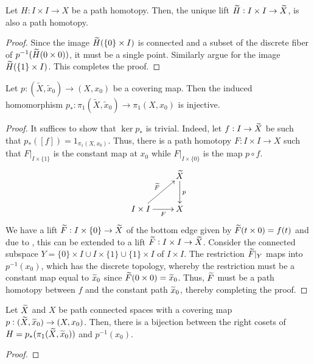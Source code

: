 \begin{corollary}
    Let $H: I\times I\to X$ be a path homotopy. Then, the unique lift $\widetilde{H}: I\times I\to\widetilde{X}$, is also a path homotopy.
\end{corollary}
\begin{proof}
    Since the image $\widetilde{H}(\{0\}\times I)$ is connected and a subset of the discrete fiber of $p^{-1}(\widetilde{H}(0\times 0))$, it must be a single point. Similarly argue for the image $\widetilde{H}(\{1\}\times I)$. This completes the proof.
\end{proof}

\begin{proposition}
    Let $p:(\widetilde X,\widetilde x_0)\to(X,x_0)$ be a covering map. Then the induced homomorphism $p_*:\pi_1(\widetilde X,\widetilde x_0)\to\pi_1(X,x_0)$ is injective.
\end{proposition}
\begin{proof}
    It suffices to show that $\ker p_*$ is trivial. Indeed, let $f: I\to\widetilde{X}$ be such that $p_*([f]) = 1_{\pi_1(X,x_0)}$. Thus, there is a path homotopy $F: I\times I\to X$ such that $F|_{I\times\{1\}}$ is the constant map at $x_0$ while $F|_{I\times\{0\}}$ is the map $p\circ f$.
    \begin{equation*}
        \xymatrix {
            & \wt X\ar[d]^{p}\\
            I\times I\ar[r]_-{F}\ar[ru]^-{\wt F} & X
        }
    \end{equation*}
    We have a lift $\widetilde{F}: I\times\{0\}\to\widetilde{X}$ of the bottom edge given by $\widetilde{F}(t\times 0) = f(t)$ and due to , this can be extended to a lift $\widetilde{F}: I\times I\to\widetilde{X}$. Consider the connected subspace $Y = \{0\}\times I\cup I\times\{1\}\cup\{1\}\times I$ of $I\times I$. The restriction $\widetilde{F}|_{Y}$ maps into $p^{-1}(x_0)$, which has the discrete topology, whereby the restriction must be a constant map equal to $\widetilde{x}_0$ since $\widetilde{F}(0\times 0) = \widetilde{x}_0$. Thus, $\widetilde{F}$ must be a path homotopy between $f$ and the constant path $\widetilde{x}_0$, thereby completing the proof.
\end{proof}

\begin{proposition}
    Let $\widetilde{X}$ and $X$ be path connected spaces with a covering map $p:(\widetilde{X}, \widetilde{x}_0)\to(X,x_0)$. Then, there is a bijection between the right cosets of $H = p_*(\pi_1(\widetilde{X}, \widetilde{x}_0))$ and $p^{-1}(x_0)$.
\end{proposition}
\begin{proof}
\end{proof}

